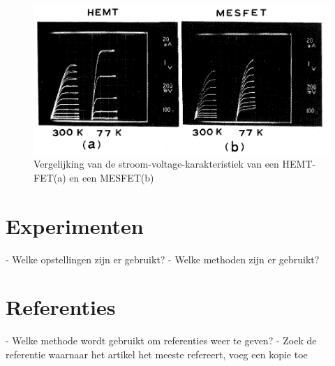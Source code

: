 \documentclass[11pt]{article}
\begin{document}
\begin{figure}[h]
  \begin{center}
\includegraphics[width=\textwidth]{CV-characteristics.png}
\caption{Vergelijking van de stroom-voltage-karakteristiek van een HEMT-FET(a) en een MESFET(b)}
\label{fig:cv_karakteristieken}
  \end{center}
\end{figure}

\clearpage

\section{Experimenten}
  - Welke opstellingen zijn er gebruikt?
  - Welke methoden zijn er gebruikt?

\section{Referenties}
  - Welke methode wordt gebruikt om referenties weer te geven?
  - Zoek de referentie waarnaar het artikel het meeste refereert, voeg een kopie toe

%
%

\appendix
\end{document}
